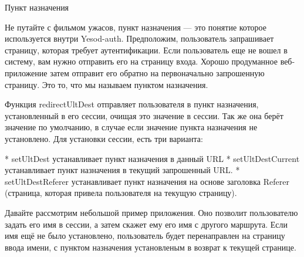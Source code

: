 Пункт назначения

Не путайте с фильмом ужасов, пункт назначения --- это понятие которое используется внутри Yesod-auth. Предположим, пользователь запрашивает страницу, которая требует аутентификации. Если пользователь еще не вошел в систему, вам нужно отправить его на страницу входа. Хорошо продуманное веб-приложение затем отправит его обратно на первоначально запрошенную страницу. Это то, что мы называем пунктом назначения. 

Функция redirectUltDest отправляет пользователя в пункт назначения, установленный в его сессии, очищая это значение в сессии. Так же она берёт значение по умолчанию, в случае если значение пункта назначения не установлено. Для установки сессии, есть три варианта:

* setUltDest устанавливает пункт назначения в данный URL
* setUltDestCurrent устанавливает пункт назначения в текущий запрошенный URL.
* setUltDestReferer устанавливает пункт назначения на основе заголовка Referer (страница, которая привела пользователя на текущую страницу). 

Давайте рассмотрим небольшой пример приложения. Оно позволит пользователю задать его имя в сессии, а затем скажет ему его имя с другого маршрута. Если имя ещё не было установлено, пользователь будет перенаправлен на страницу ввода имени, с пунктом назначения установленым в возврат к текущей странице.

